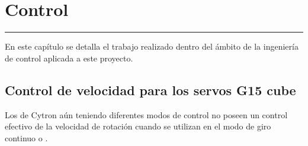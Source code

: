\chapter{Control} \label{chap:Control}
\hrule
\vspace{3mm}
En este capítulo se detalla el trabajo realizado dentro del ámbito de la ingeniería de control aplicada a este proyecto.

\section{Control de velocidad para los servos G15 cube} \label{sec:Control:velocidad_g15}

Los  de Cytron aún teniendo diferentes modos de control no poseen un control efectivo de la velocidad de rotación cuando se utilizan en el modo de giro continuo o .